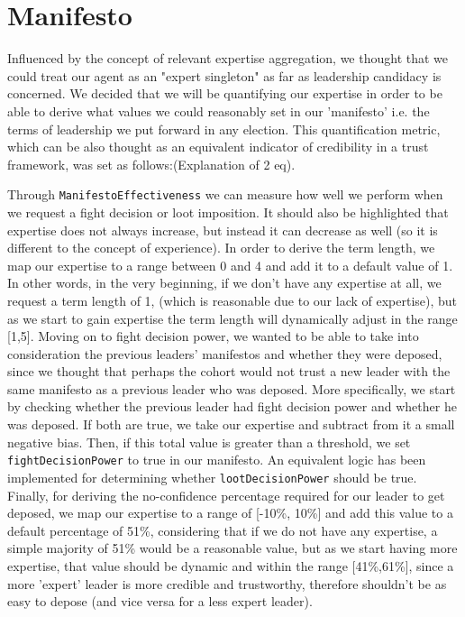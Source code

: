\section{Manifesto}

Influenced by the concept of relevant expertise aggregation, we thought that we could treat our agent as an "expert singleton" as far as leadership candidacy is concerned. We decided that we will be quantifying our expertise in order to be able to derive what values we could reasonably set in our 'manifesto' i.e. the terms of leadership we put forward in any election. This quantification metric, which can be also thought as an equivalent indicator of credibility in a trust framework, was set as follows:(Explanation of 2 eq). 

Through \verb|ManifestoEffectiveness| we can measure how well we perform when we request a fight decision or loot imposition. It should also be highlighted that expertise does not always increase, but instead it can decrease as well (so it is different to the concept of experience). In order to derive the term length, we map our expertise to a range between 0 and 4 and add it to a default value of 1. In other words, in the very beginning, if we don't have any expertise at all, we request a term length of 1, (which is reasonable due to our lack of expertise), but as we start to gain expertise the term length will dynamically adjust in the range [1,5]. Moving on to fight decision power, we wanted to be able to take into consideration the previous leaders' manifestos and whether they were deposed, since we thought that perhaps the cohort would not trust a new leader with the same manifesto as a previous leader who was deposed. More specifically, we start by checking whether the previous leader had fight decision power and whether he was deposed. If both are true, we take our expertise and subtract from it a small negative bias. Then, if this total value is greater than a threshold, we set \verb|fightDecisionPower| to true in our manifesto. An equivalent logic has been implemented for determining whether \verb|lootDecisionPower| should be true. Finally, for deriving the no-confidence percentage required for our leader to get deposed, we map our expertise to a range of [-10\%, 10\%] and add this value to a default percentage of 51\%, considering that if we do not have any expertise, a simple majority of 51\% would be a reasonable value, but as we start having more expertise, that value should be dynamic and within the range [41\%,61\%], since a more 'expert' leader is more credible and trustworthy, therefore shouldn't be as easy to depose (and vice versa for a less expert leader).


